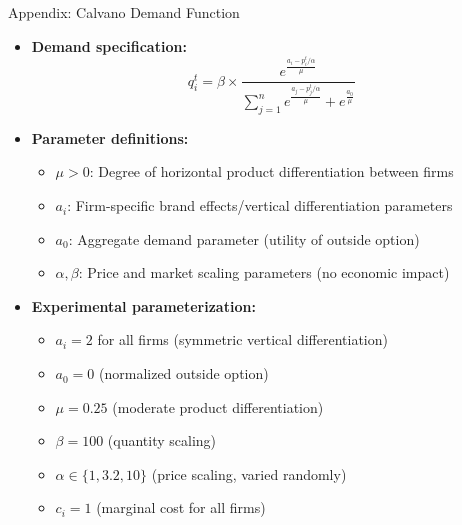 \documentclass[10pt, aspectratio=169]{beamer}
\begin{document}
\begin{frame}{Appendix: Calvano Demand Function}\label{app:calvano}
    \begin{itemize}
        \item \textbf{Demand specification:}
        $$q_i^t = \beta \times \frac{e^{\frac{a_i - p_i^t/\alpha}{\mu}}}{\sum_{j=1}^{n} e^{\frac{a_j - p_j^t/\alpha}{\mu}} + e^{\frac{a_0}{\mu}}}$$
        
        \item \textbf{Parameter definitions:}
        \begin{itemize}
            \item $\mu > 0$: Degree of horizontal product differentiation between firms
            \item $a_i$: Firm-specific brand effects/vertical differentiation parameters
            \item $a_0$: Aggregate demand parameter (utility of outside option)
            \item $\alpha, \beta$: Price and market scaling parameters (no economic impact)
        \end{itemize}
        
        \item \textbf{Experimental parameterization:}
        \begin{itemize}
            \item $a_i = 2$ for all firms (symmetric vertical differentiation)
            \item $a_0 = 0$ (normalized outside option)
            \item $\mu = 0.25$ (moderate product differentiation)
            \item $\beta = 100$ (quantity scaling)
            \item $\alpha \in \{1, 3.2, 10\}$ (price scaling, varied randomly)
            \item $c_i = 1$ (marginal cost for all firms) \hfill{}
        \end{itemize}
    \end{itemize}
\end{frame}

\end{document}
